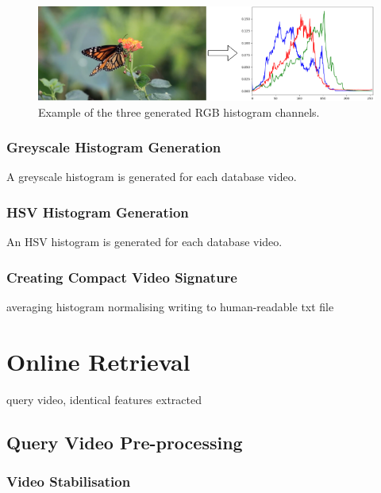 \begin{figure}[h] 
\centerline{\includegraphics[width=\textwidth]{figures/implementation/rgb_histogram_generation.png}}
\caption{\label{fig:implementation-rgb_histogram_generation}Example of the three generated RGB histogram channels.}
\end{figure}

\subsubsection{Greyscale Histogram Generation}

A greyscale histogram is generated for each database video. 

\subsubsection{HSV Histogram Generation}

An HSV histogram is generated for each database video. 

\subsubsection{Creating Compact Video Signature}

averaging histogram
normalising
writing to human-readable txt file

\section{Online Retrieval}

query video, identical features extracted

\subsection{Query Video Pre-processing}

\subsubsection{Video Stabilisation}

